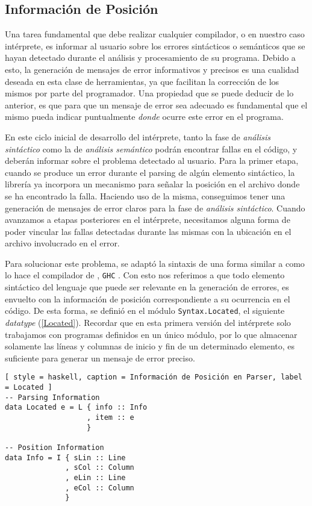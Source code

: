 \subsection{Información de Posición}

Una tarea fundamental que debe realizar cualquier compilador, o en nuestro caso intérprete, es informar al usuario sobre los errores sintácticos o semánticos que se hayan detectado durante el análisis y procesamiento de su programa.
Debido a esto, la generación de mensajes de error informativos y precisos es una cualidad deseada en esta clase de herramientas, ya que facilitan la corrección de los mismos por parte del programador.
Una propiedad que se puede deducir de lo anterior, es que para que un mensaje de error sea adecuado es fundamental que el mismo pueda indicar puntualmente \textit{donde} ocurre este error en el programa.

En este ciclo inicial de desarrollo del intérprete, tanto la fase de \textit{análisis sintáctico} como la de \textit{análisis semántico} podrán encontrar fallas en el código, y deberán informar sobre el problema detectado al usuario.
Para la primer etapa, cuando se produce un error durante el parsing de algún elemento sintáctico, la librería \Megaparsec{} ya incorpora un mecanismo para señalar la posición en el archivo donde se ha encontrado la falla.
Haciendo uso de la misma, conseguimos tener una generación de mensajes de error claros para la fase de \textit{análisis sintáctico}.
Cuando avanzamos a etapas posteriores en el intérprete, necesitamos alguna forma de poder vincular las fallas detectadas durante las mismas con la ubicación en el archivo involucrado en el error.

Para solucionar este problema, se adaptó la sintaxis de una forma similar a como lo hace el compilador de \Haskell{}, \texttt{GHC} \cite{GHC}.
Con esto nos referimos a que todo elemento sintáctico del lenguaje que puede ser relevante en la generación de errores, es envuelto con la información de posición correspondiente a su ocurrencia en el código.
De esta forma, se definió en el módulo \lstinline[style = module]{Syntax.Located}, el siguiente \textit{datatype} (\ref{Located}).
Recordar que en esta primera versión del intérprete solo trabajamos con programas definidos en un único módulo, por lo que almacenar solamente las líneas y columnas de inicio y fin de un determinado elemento, es suficiente para generar un mensaje de error preciso.

\begin{lstlisting}[ style = haskell, caption = Información de Posición en Parser, label = Located ]
-- Parsing Information
data Located e = L { info :: Info
                   , item :: e
                   }

-- Position Information
data Info = I { sLin :: Line
              , sCol :: Column
              , eLin :: Line
              , eCol :: Column
              }
\end{lstlisting}

